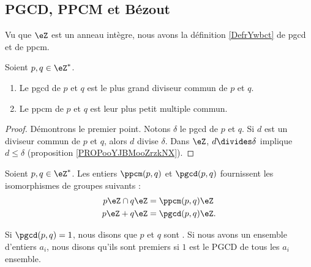 

\subsection{PGCD, PPCM et Bézout}

Vu que \( \eZ\) est un anneau intègre, nous avons la définition \ref{DefrYwbct} de pgcd et de ppcm.
\begin{proposition}       \label{PROPooAVRGooUfhjwF}
    Soient \( p,q\in\eZ^*\). 
    \begin{enumerate}
        \item
            Le pgcd de \( p\) et \( q\) est le plus grand diviseur commun de \( p\) et \( q\). 
        \item
            Le ppcm de \( p\) et \( q\) est leur plus petit multiple commun.
    \end{enumerate}
\end{proposition}

\begin{proof}
    Démontrons le premier point. Notons \( \delta\) le pgcd de \( p\) et \( q\). Si \( d\) est un diviseur commun de \( p\) et \( q\), alors \( d\) divise \( \delta\). Dans \( \eZ\), \( d\divides \delta\) implique \( d\leq\delta\) (proposition \ref{PROPooYJBMooZrzkNX}).
\end{proof}

\begin{lemma}
    Soient \( p,q\in\eZ^*\). Les entiers \( \ppcm(p,q)\) et \( \pgcd(p,q)\) fournissent les isomorphismes de groupes suivants :
\begin{subequations}
    \begin{align}
        p\eZ\cap q\eZ&=\ppcm(p,q)\eZ\\
        p\eZ + q\eZ&=\pgcd(p,q)\eZ.
    \end{align}
\end{subequations}
\end{lemma}

\begin{definition}  \label{DefZHRXooNeWIcB}
    Si \( \pgcd(p,q)=1\), nous disons que \( p\) et \( q\) sont . Si nous avons un ensemble d'entiers \( a_i\), nous disons qu'ils sont premiers  si \( 1\) est le PGCD de tous les \( a_i\) ensemble.
\end{definition}

